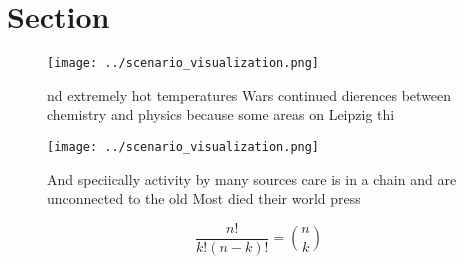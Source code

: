 \documentclass[a4paper]{article}
\begin{document}
\section{Section}

\begin{figure}
\centering
\texttt{[image: ../scenario\_visualization.png]}
\caption{ nd extremely hot temperatures Wars continued dierences between chemistry and physics because some areas on Leipzig thi
}
\end{figure}
 
\begin{figure}
\centering
\texttt{[image: ../scenario\_visualization.png]}
\caption{And speciically activity by many sources care is in a chain and are unconnected to the old Most died their world press 
}
\end{figure}
 
\[ \frac{n!}{k!(n-k)!} = \binom{n}{k} \]
\end{document}
